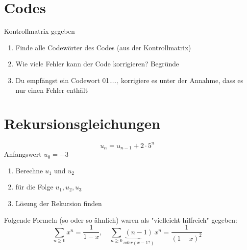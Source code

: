 \documentclass{article} %
\begin{document}
\section{Codes}
Kontrollmatrix gegeben
\begin{enumerate}
    \item Finde alle Codewörter des Codes (aus der Kontrollmatrix)
    \item Wie viele Fehler kann der Code korrigieren? Begründe
    \item Du empfängst ein Codewort 01...., korrigiere es unter der Annahme, dass es nur einen Fehler enthält
\end{enumerate}

\section{Rekursionsgleichungen}

\begin{equation*}
    u_n = u_{n-1} + 2 \cdot 5^n
\end{equation*}
Anfangswert $u_0 = -3$

\begin{enumerate}
    \item Berechne $u_1$ und $u_2$
    \item für die Folge $u_1, u_2, u_3$ 
    \item Lösung der Rekursion finden 
\end{enumerate}

Folgende Formeln (so oder so ähnlich) waren als "vielleicht hilfreich" gegeben: 
\begin{equation*}
    \sum_{n \geq 0} x^n = \frac{1}{1-x}, \quad \sum_{n \geq 0} \underbrace{(n-1)}_{oder (x-1?)}x^n = \frac{1}{(1-x)^2}
\end{equation*}
\end{document}
